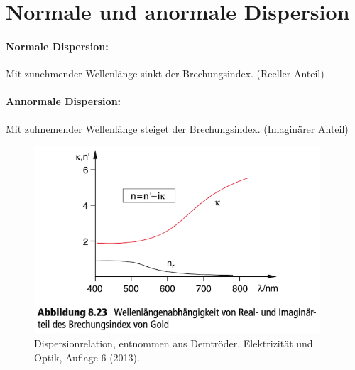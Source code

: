 
\section{Normale und anormale Dispersion}
\label{sec:dispersion}

\paragraph*{Normale Dispersion: }
Mit zunehmender Wellenlänge sinkt der Brechungsindex. (Reeller Anteil)

\paragraph*{Annormale Dispersion: }
Mit zuhnemender Wellenlänge steiget der Brechungsindex. (Imaginärer Anteil)

\begin{figure}[h]
    \includegraphics[width=0.95\textwidth]{Bilder/Dispersion.png}
    \caption{Dispersionrelation, entnommen aus Demtröder, Elektrizität und Optik, Auflage 6 (2013).}
\end{figure}